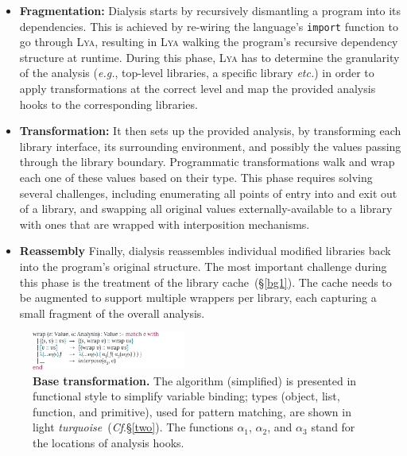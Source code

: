 \documentclass[letterpaper,twocolumn,10pt]{article}
\def\eg{{\em e.g.}, }
\def\etc{{\em etc.}\xspace}
\newcommand{\ttt}[1]{\texttt{#1}}
\newcommand{\cf}[1]{(\emph{Cf}.\S\ref{#1})}
\newcommand{\sx}[1]{(\S\ref{#1})}
\newcommand{\sys}{{\scshape Lya}\xspace}
\begin{document}
\begin{itemize}
  
  \item \textbf{Fragmentation:}
Dialysis starts by recursively dismantling a program into its dependencies. %
This is achieved by re-wiring the language's \ttt{import} function to go through \sys, resulting in \sys walking the program's recursive dependency structure at runtime.
During this phase, \sys has to determine the granularity of the analysis (\eg top-level libraries, a specific library \etc) in order to apply transformations at the correct level and map the provided analysis hooks to the corresponding libraries.

  \item \textbf{Transformation:}
It then sets up the provided analysis, by transforming each library interface, its surrounding environment, and possibly the values passing through the library boundary.
Programmatic transformations walk and wrap each one of these values based on their type.
This phase requires solving several challenges, including enumerating all points of entry into and exit out of a library, 
and swapping all original values externally-available to a library with ones that are wrapped with interposition mechanisms.

  \item \textbf{Reassembly}
Finally, dialysis reassembles individual modified libraries back into the program's original structure.
The most important challenge during this phase is the treatment of the library cache~\sx{bg1}.
The cache needs to be augmented to support multiple wrappers per library, each capturing a small fragment of the overall analysis.

\end{itemize}


\begin{figure}[t]
\raggedleft 
\includegraphics[width=0.45\textwidth]{./figs/lya_base.pdf}
\caption{
  \textbf{Base transformation.}
  \textmd{
  The algorithm (simplified) is presented in functional style to simplify variable binding; types (object, list, function, and primitive), used for pattern matching, are shown in light {\color{cdb} \emph{turquoise}}~\cf{two}. The functions $\alpha_1$, $\alpha_2$, and $\alpha_3$ stand for the locations of analysis hooks.
  }
  \vspace{-4mm}
}
\label{fig:base}
\end{figure}
\end{document}
